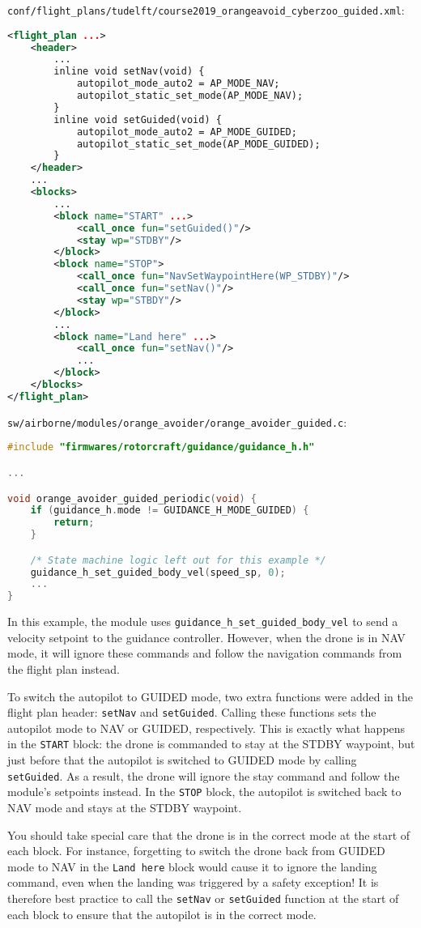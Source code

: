 \documentclass{article}
\begin{document}
\texttt{conf/flight\_plans/tudelft/course2019\_orangeavoid\_cyberzoo\_guided.xml}:
\begin{lstlisting}[language=xml]
<flight_plan ...>
	<header>
		...
		inline void setNav(void) {
			autopilot_mode_auto2 = AP_MODE_NAV;
			autopilot_static_set_mode(AP_MODE_NAV);
		}
		inline void setGuided(void) {
			autopilot_mode_auto2 = AP_MODE_GUIDED;
			autopilot_static_set_mode(AP_MODE_GUIDED);
		}
	</header>
	...
	<blocks>
		...
		<block name="START" ...>
			<call_once fun="setGuided()"/>
			<stay wp="STDBY"/>
		</block>
		<block name="STOP">
			<call_once fun="NavSetWaypointHere(WP_STDBY)"/>
			<call_once fun="setNav()"/>
			<stay wp="STBDY"/>
		</block>
		...
		<block name="Land here" ...>
			<call_once fun="setNav()"/>
			...
		</block>
	</blocks>
</flight_plan>
\end{lstlisting}

\texttt{sw/airborne/modules/orange\_avoider/orange\_avoider\_guided.c}:
\begin{lstlisting}[language=c]
#include "firmwares/rotorcraft/guidance/guidance_h.h"

...

void orange_avoider_guided_periodic(void) {
	if (guidance_h.mode != GUIDANCE_H_MODE_GUIDED) {
		return;
	}

	/* State machine logic left out for this example */
	guidance_h_set_guided_body_vel(speed_sp, 0);
	...
}
\end{lstlisting}

In this example, the module uses \texttt{guidance\_h\_set\_guided\_body\_vel} to send a velocity setpoint to the guidance controller. However, when the drone is in NAV mode, it will ignore these commands and follow the navigation commands from the flight plan instead.

To switch the autopilot to GUIDED mode, two extra functions were added in the flight plan header: \texttt{setNav} and \texttt{setGuided}. Calling these functions sets the autopilot mode to NAV or GUIDED, respectively. This is exactly what happens in the \texttt{START} block: the drone is commanded to stay at the STDBY waypoint, but just before that the autopilot is switched to GUIDED mode by calling \texttt{setGuided}. As a result, the drone will ignore the stay command and follow the module's setpoints instead. In the \texttt{STOP} block, the autopilot is switched back to NAV mode and stays at the STDBY waypoint.

You should take special care that the drone is in the correct mode at the start of each block. For instance, forgetting to switch the drone back from GUIDED mode to NAV in the \texttt{Land here} block would cause it to ignore the landing command, even when the landing was triggered by a safety exception! It is therefore best practice to call the \texttt{setNav} or \texttt{setGuided} function at the start of each block to ensure that the autopilot is in the correct mode.
\end{document}
